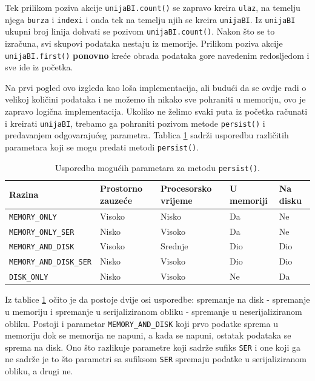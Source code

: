 \documentclass[times, utf8, zavrsni, numeric]{fer}
\begin{document}
Tek prilikom poziva akcije \texttt{unijaBI.count()} se zapravo kreira  \texttt{ulaz}, na temelju njega \texttt{burza} i \texttt{indexi} i onda tek na temelju njih se kreira \texttt{unijaBI}. Iz  \texttt{unijaBI} ukupni broj linija dohvati se pozivom \texttt{unijaBI.count()}. 
Nakon što se to izračuna, svi skupovi podataka nestaju iz memorije.  Prilikom poziva akcije \texttt{unijaBI.first()} \textbf{ponovno} kreće obrada podataka gore navedenim redosljedom i sve ide iz početka.

Na prvi pogled ovo izgleda kao loša implementacija, ali budući da se ovdje radi o velikoj količini podataka i ne možemo ih nikako sve pohraniti u memoriju, ovo je zapravo logična implementacija. 
Ukoliko ne želimo svaki puta iz početka računati i kreirati \texttt{unijaBI}, trebamo ga pohraniti pozivom metode \texttt{persist()} i predavanjem odgovarajućeg parametra. Tablica \ref{tbl:razinePerzistencije} sadrži usporedbu različitih parametara koji se mogu predati metodi \texttt{persist()}.

\begin{table}[htb]
\scriptsize
\caption{Usporedba mogućih parametara za metodu \texttt{persist()}.}
\label{tbl:razinePerzistencije}
\centering
\begin{tabular}{lllll} 
\hline
Razina & Prostorno zauzeće & Procesorsko vrijeme & U memoriji & Na disku\\
\hline
\texttt{MEMORY\_ONLY} & Visoko & Nisko & Da & Ne  \\
\texttt{MEMORY\_ONLY\_SER} & Nisko & Visoko & Da & Ne  \\
\texttt{MEMORY\_AND\_DISK} & Visoko & Srednje & Dio & Dio \\
\texttt{MEMORY\_AND\_DISK\_SER} & Nisko & Visoko & Dio & Dio \\
\texttt{DISK\_ONLY} & Nisko & Visoko & Ne & Da \\
\hline
\end{tabular}
\end{table}

Iz tablice \ref{tbl:razinePerzistencije} očito je da postoje dvije osi usporedbe: spremanje na disk - spremanje u memoriju i spremanje u serijaliziranom obliku - spremanje u neserijaliziranom obliku. Postoji i parametar \texttt{MEMORY\_AND\_DISK} koji prvo podatke sprema u memoriju dok se memorija ne napuni, a kada se napuni, ostatak podataka se sprema na disk. Ono što razlikuje parametre koji sadrže sufiks \texttt{SER} i one koji ga ne sadrže je to što parametri sa sufiksom \texttt{SER} spremaju podatke u serijaliziranom obliku, a drugi ne.
\end{document}
